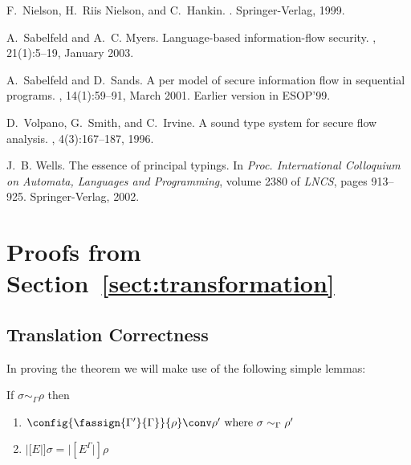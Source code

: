 \documentclass{sigplanconf}
\begin{document}
\begin{thebibliography}{ADvRF01}
F.~Nielson, H.~{Riis Nielson}, and C.~Hankin.
.
\newblock Springer-Verlag, 1999.

A.~Sabelfeld and A.~C. Myers.
\newblock Language-based information-flow security.
, 21(1):5--19, January
  2003.

A.~Sabelfeld and D.~Sands.
\newblock A per model of secure information flow in sequential programs.
, 14(1):59--91, March
  2001.
\newblock Earlier version in ESOP'99.

D.~Volpano, G.~Smith, and C.~Irvine.
\newblock A sound type system for secure flow analysis.
, 4(3):167--187, 1996.

J.~B. Wells.
\newblock The essence of principal typings.
\newblock In {\em Proc. International Colloquium on Automata, Languages and
  Programming}, volume 2380 of {\em LNCS}, pages 913--925. Springer-Verlag,
  2002.

\end{thebibliography}

\clearpage
\appendix

\section{Proofs from Section~\ref{sect:transformation}}

\subsection{Translation Correctness}\label{appendix:translation}
In proving the theorem we will make use of the following simple lemmas:
\begin{lemma}\label{lemma:sim}
If $\sigma \sim_\Gamma \rho$ then 
\begin{enumerate}
\item \label{a}
\( \config{\fassign{\Gamma'}{\Gamma}}{\rho}\conv \rho'
\mbox{ where }   \sigma \sim_\Gamma \rho'
\)
\item \label{b}
\(
|[E|]\sigma = |[E^\Gamma|]\rho
\)
\end{enumerate}
\end{lemma}
\end{document}
